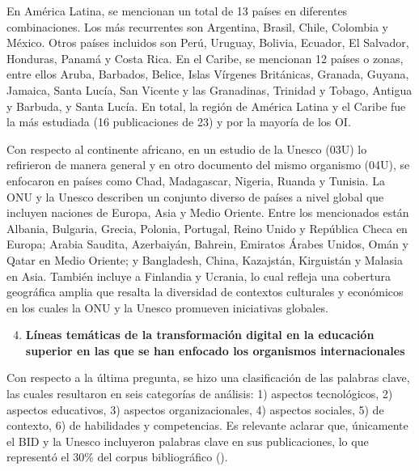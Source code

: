 En América Latina, se mencionan un total de 13 países en diferentes
combinaciones. Los más recurrentes son Argentina, Brasil, Chile,
Colombia y México. Otros países incluidos son Perú, Uruguay, Bolivia,
Ecuador, El Salvador, Honduras, Panamá y Costa Rica. En el Caribe, se
mencionan 12 países o zonas, entre ellos Aruba, Barbados, Belice, Islas
Vírgenes Británicas, Granada, Guyana, Jamaica, Santa Lucía, San Vicente
y las Granadinas, Trinidad y Tobago, Antigua y Barbuda, y Santa Lucía.
En total, la región de América Latina y el Caribe fue la más estudiada
(16 publicaciones de 23) y por la mayoría de los OI.

Con respecto al continente africano, en un estudio de la Unesco (03U) lo
refirieron de manera general y en otro documento del mismo organismo
(04U), se enfocaron en países como Chad, Madagascar, Nigeria, Ruanda y
Tunisia. La ONU y la Unesco describen un conjunto diverso de países a
nivel global que incluyen naciones de Europa, Asia y Medio Oriente.
Entre los mencionados están Albania, Bulgaria, Grecia, Polonia,
Portugal, Reino Unido y República Checa en Europa; Arabia Saudita,
Azerbaiyán, Bahrein, Emiratos Árabes Unidos, Omán y Qatar en Medio
Oriente; y Bangladesh, China, Kazajstán, Kirguistán y Malasia en Asia.
También incluye a Finlandia y Ucrania, lo cual refleja una cobertura
geográfica amplia que resalta la diversidad de contextos culturales y
económicos en los cuales la ONU y la Unesco promueven iniciativas
globales.

\begin{enumerate}[label=\textbf{PI\arabic*}]
\setcounter{enumi}{3}
\item
  \textbf{Líneas temáticas de la transformación digital en la educación
  superior en las que se han enfocado los organismos internacionales}
\end{enumerate}

Con respecto a la última pregunta, se hizo una clasificación de las
palabras clave, las cuales resultaron en seis categorías de análisis: 1)
aspectos tecnológicos, 2) aspectos educativos, 3) aspectos
organizacionales, 4) aspectos sociales, 5) de contexto, 6) de
habilidades y competencias. Es relevante aclarar que, únicamente el BID
y la Unesco incluyeron palabras clave en sus publicaciones, lo que
representó el 30\% del corpus bibliográfico ().


